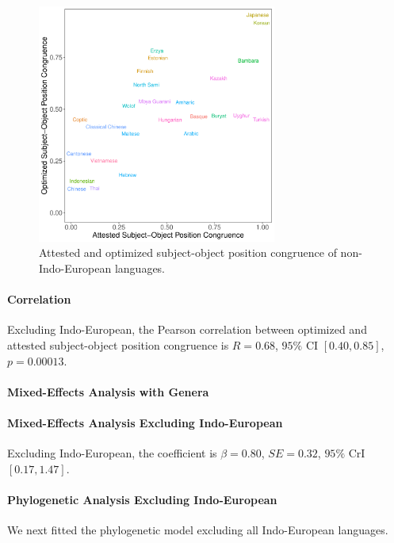 \documentclass[11pt,a4paper]{article}
\begin{document}
\begin{figure}
    \centering
    \includegraphics[width=0.7\textwidth]{../analysis/figures/fracion-optimized_DLM_2.6_format_NoIE.pdf}
    \caption{Attested and optimized subject-object position congruence of non-Indo-European languages.}
    \label{fig:todo}
\end{figure}




\paragraph{Correlation}

Excluding Indo-European, the Pearson correlation between optimized and attested subject-object position congruence is $R=0.68$, $95\%$ CI $[0.40, 0.85]$, $p = 0.00013$.


\paragraph{Mixed-Effects Analysis with Genera}

\paragraph{Mixed-Effects Analysis Excluding Indo-European}

Excluding Indo-European, the coefficient is $\beta=0.80$, $SE=0.32$, $95\%$ CrI $[0.17, 1.47]$.



\paragraph{Phylogenetic Analysis Excluding Indo-European}
We next fitted the phylogenetic model excluding all Indo-European languages.
\end{document}
